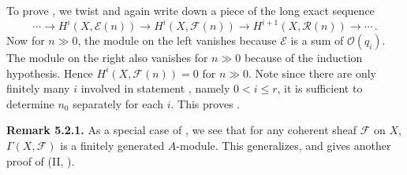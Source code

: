 {To prove , we twist and again write down a piece of the long exact sequence
\[
\cdots\to H^i(X,\mathcal E(n))\to H^i(X,\mathcal F(n))\to H^{i+1}(X,\mathcal R(n))\to\cdots\,.
\]
Now for $n\gg0$, the module on the left vanishes because $\mathcal E$ is a sum of $\mathcal O(q_i)$. The module on the right also vanishes for $n\gg0$ because of the induction hypothesis. Hence $H^i(X,\mathcal F(n))=0$ for $n\gg0$. Note since there are only finitely many $i$ involved in statement , namely $0<i\leq r$, it is sufficient to determine $n_0$ separately for each $i$. This proves .

\medskip
\noindent\hypertarget{result-III-5.2.1}{}\textbf{Remark 5.2.1.} As a special case of , we see that for any coherent sheaf $\mathcal F$ on $X$, $\Gamma(X,\mathcal F)$ is a finitely generated $A$-module. This generalizes, and gives another proof of (II, ).
}
